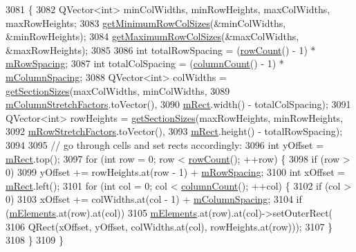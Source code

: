 \begin{DoxyCode}
3081                                  \{
3082   QVector<int> minColWidths, minRowHeights, maxColWidths, maxRowHeights;
3083   \hyperlink{class_q_c_p_layout_grid_ac645fb9b1c4257b08a9f09dee10b9b3f}{getMinimumRowColSizes}(&minColWidths, &minRowHeights);
3084   \hyperlink{class_q_c_p_layout_grid_af348d903e3b8bc416f1fe1b8125d1173}{getMaximumRowColSizes}(&maxColWidths, &maxRowHeights);
3085 
3086   \textcolor{keywordtype}{int} totalRowSpacing = (\hyperlink{class_q_c_p_layout_grid_af8e6c7a05864ebe610c87756c7b9079c}{rowCount}() - 1) * \hyperlink{class_q_c_p_layout_grid_a8b67f183f4645739cc4c794d75843b40}{mRowSpacing};
3087   \textcolor{keywordtype}{int} totalColSpacing = (\hyperlink{class_q_c_p_layout_grid_ac39074eafd148b82d0762090f258189e}{columnCount}() - 1) * \hyperlink{class_q_c_p_layout_grid_ae9ac48f0791be07ead0a96dbd5622770}{mColumnSpacing};
3088   QVector<int> colWidths = \hyperlink{class_q_c_p_layout_a92d9dcd95e9510b323706ef7fc4ff62e}{getSectionSizes}(maxColWidths, minColWidths,
3089                                            \hyperlink{class_q_c_p_layout_grid_ac6aabe62339f94f18b9f8adab94b1840}{mColumnStretchFactors}.toVector(),
3090                                            \hyperlink{class_q_c_p_layout_element_ad8896f05550389f7b9e92c9e6cdf6e01}{mRect}.width() - totalColSpacing);
3091   QVector<int> rowHeights = \hyperlink{class_q_c_p_layout_a92d9dcd95e9510b323706ef7fc4ff62e}{getSectionSizes}(maxRowHeights, minRowHeights,
3092                                             \hyperlink{class_q_c_p_layout_grid_a36c85a7eaf342680fb9b8a4977486f16}{mRowStretchFactors}.toVector(),
3093                                             \hyperlink{class_q_c_p_layout_element_ad8896f05550389f7b9e92c9e6cdf6e01}{mRect}.height() - totalRowSpacing);
3094 
3095   \textcolor{comment}{// go through cells and set rects accordingly:}
3096   \textcolor{keywordtype}{int} yOffset = \hyperlink{class_q_c_p_layout_element_ad8896f05550389f7b9e92c9e6cdf6e01}{mRect}.top();
3097   \textcolor{keywordflow}{for} (\textcolor{keywordtype}{int} row = 0; row < \hyperlink{class_q_c_p_layout_grid_af8e6c7a05864ebe610c87756c7b9079c}{rowCount}(); ++row) \{
3098     \textcolor{keywordflow}{if} (row > 0)
3099       yOffset += rowHeights.at(row - 1) + \hyperlink{class_q_c_p_layout_grid_a8b67f183f4645739cc4c794d75843b40}{mRowSpacing};
3100     \textcolor{keywordtype}{int} xOffset = \hyperlink{class_q_c_p_layout_element_ad8896f05550389f7b9e92c9e6cdf6e01}{mRect}.left();
3101     \textcolor{keywordflow}{for} (\textcolor{keywordtype}{int} col = 0; col < \hyperlink{class_q_c_p_layout_grid_ac39074eafd148b82d0762090f258189e}{columnCount}(); ++col) \{
3102       \textcolor{keywordflow}{if} (col > 0)
3103         xOffset += colWidths.at(col - 1) + \hyperlink{class_q_c_p_layout_grid_ae9ac48f0791be07ead0a96dbd5622770}{mColumnSpacing};
3104       \textcolor{keywordflow}{if} (\hyperlink{class_q_c_p_layout_grid_a2ec4664bcfb5d479255e50f0c074f7c9}{mElements}.at(row).at(col))
3105         \hyperlink{class_q_c_p_layout_grid_a2ec4664bcfb5d479255e50f0c074f7c9}{mElements}.at(row).at(col)->setOuterRect(
3106             QRect(xOffset, yOffset, colWidths.at(col), rowHeights.at(row)));
3107     \}
3108   \}
3109 \}
\end{DoxyCode}


